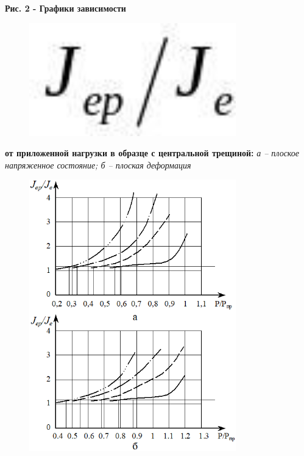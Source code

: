 {\bfseries Рис. 2 - Графики зависимости}
\begin{figure}[H]
	\centering
	\includegraphics[width=0.8\textwidth]{assets/1149}
	\caption*{}
\end{figure} {\bfseries от приложенной нагрузки в
образце с центральной трещиной:} \emph{а -- плоское напряженное
состояние; б -- плоская деформация}

\begin{figure}[H]
	\centering
	\includegraphics[width=0.8\textwidth]{assets/1150}
	\caption*{}
\end{figure}

